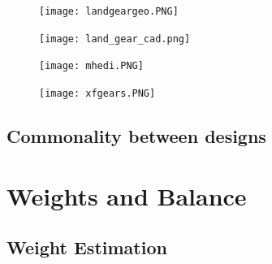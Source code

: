\documentclass[11pt]{article}
\begin{document}
\FloatBarrier
\begin{figure}[h!] %
\centering
\begin{minipage}{.5\textwidth}
	\centering
	\texttt{[image: landgeargeo.PNG]}
	\label{fig:geartip}
\end{minipage}%
\begin{minipage}{.5\textwidth}
	\centering
	\texttt{[image: land\_gear\_cad.png]}
	\label{fig:xfgeartip}
\end{minipage}
\end{figure}


\begin{figure}[h!] %
\centering
\begin{minipage}{.5\textwidth}
	\texttt{[image: mhedi.PNG]}
	\label{fig:mhedi}
\end{minipage}%
\begin{minipage}{.5\textwidth}
	\centering
	\texttt{[image: xfgears.PNG]}
	\label{fig:xgears}
\end{minipage}
\end{figure}

\subsection{Commonality between designs}

\section{Weights and Balance} 

\subsection{Weight Estimation}
\end{document}
